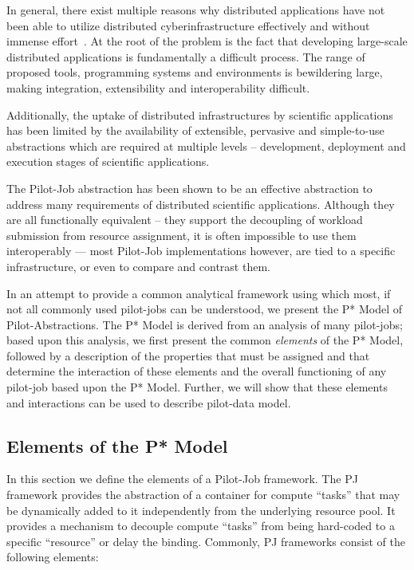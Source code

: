 \documentclass[conference,final]{IEEEtran}
\begin{document}
In general, there exist multiple reasons why distributed applications
have not been able to utilize distributed cyberinfrastructure
effectively and without immense effort~\cite{dpa_surveypaper}.  At the
root of the problem is the fact that developing large-scale
distributed applications is fundamentally a difficult process. The
range of proposed tools, programming systems and environments is
bewildering large, making integration, extensibility and
interoperability difficult.
 
Additionally, the uptake of distributed infrastructures by scientific
applications has been limited by the availability of extensible,
pervasive and simple-to-use abstractions which are required at
multiple levels – development, deployment and execution stages of
scientific applications.


The Pilot-Job abstraction has been shown to be an effective
abstraction to address many requirements of distributed scientific
applications. Although they are all functionally equivalent -- they
support the decoupling of workload submission from resource
assignment, it is often impossible to use them interoperably --- most
Pilot-Job implementations however, are tied to a specific
infrastructure, or even to compare and contrast them.

In an attempt to provide a common analytical framework using which
most, if not all commonly used pilot-jobs can be understood, we
present the P* Model of Pilot-Abstractions. The P* Model is derived
from an analysis of many pilot-jobs; based upon this analysis, we
first present the common {\it elements} of the P* Model, followed by
a description of the properties that must be assigned and that
determine the interaction of these elements and the overall
functioning of any pilot-job based upon the P* Model. Further, we will show
that these elements and interactions can be used to describe pilot-data
model.

\subsection{Elements of the P* Model}

In this section we define the elements of a Pilot-Job framework. The PJ
framework provides the abstraction of a container for compute ``tasks''
that may be dynamically added to it independently from the underlying resource
pool. It provides a mechanism to decouple compute ``tasks'' from being
hard-coded to a specific ``resource'' or delay the binding. Commonly, PJ 
frameworks consist of the following elements:
\end{document}
